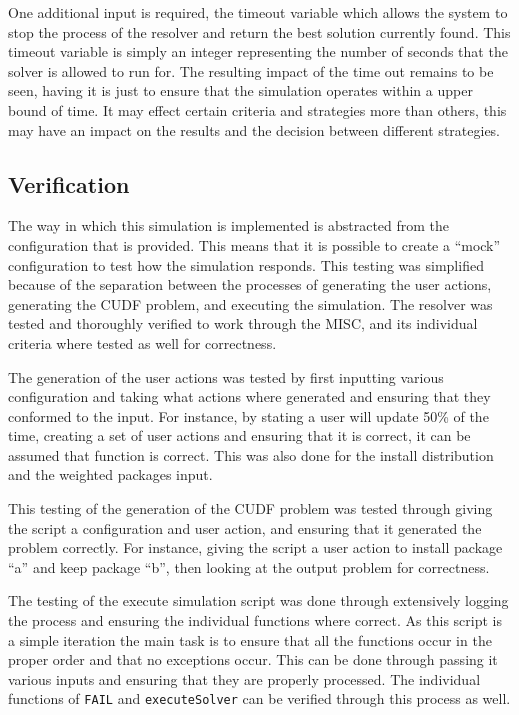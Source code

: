 One additional input is required, the timeout variable which allows the system to stop the process of the resolver and return the best solution currently found.
This timeout variable is simply an integer representing the number of seconds that the solver is allowed to run for.
The resulting impact of the time out remains to be seen, having it is just to ensure that the simulation operates within a upper bound of time.
It may effect certain criteria and strategies more than others, this may have an impact on the results and the decision between different strategies.

\subsection{Verification}
The way in which this simulation is implemented is abstracted from the configuration that is provided.
This means that it is possible to create a ``mock'' configuration to test how the simulation responds.
This testing was simplified because of the separation between the processes of generating the user actions, generating the CUDF problem, and executing the simulation.
The resolver was tested and thoroughly verified to work through the MISC, and its individual criteria where tested as well for correctness.

The generation of the user actions was tested by first inputting various configuration and taking what actions where generated and ensuring that they conformed to the input.
For instance, by stating a user will update 50\% of the time, creating a set of user actions and ensuring that it is correct, it can be assumed that function is correct.
This was also done for the install distribution and the weighted packages input.

This testing of the generation of the CUDF problem was tested through giving the script a configuration and user action, and ensuring that it generated the problem correctly. 
For instance, giving the script a user action to install package ``a'' and keep package ``b'', then looking at the output problem for correctness.

The testing of the execute simulation script was done through extensively logging the process and ensuring the individual functions where correct.
As this script is a simple iteration the main task is to ensure that all the functions occur in the proper order and that no exceptions occur.
This can be done through passing it various inputs and ensuring that they are properly processed.
The individual functions of \verb+FAIL+ and \verb+executeSolver+ can be verified through this process as well.



